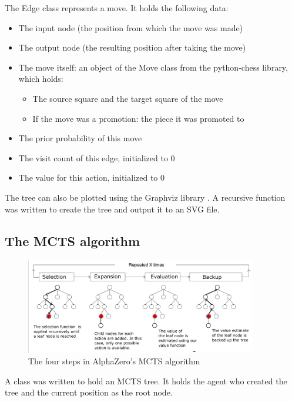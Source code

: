 \documentclass{article}
\begin{document}
The Edge class represents a move. It holds the following data:

\begin{itemize}
    \item The input node (the position from which the move was made)
    \item The output node (the resulting position after taking the move)
    \item The move itself: an object of the Move class from the python-chess library, which holds:
    \begin{itemize}
        \item The source square and the target square of the move
        \item If the move was a promotion: the piece it was promoted to
    \end{itemize}
    \item The prior probability of this move
    \item The visit count of this edge, initialized to 0
    \item The value for this action, initialized to 0
\end{itemize}

The tree can also be plotted using the Graphviz library \cite{Graphviz}. A recursive function was written to 
create the tree and output it to an SVG file. 

\subsection{The MCTS algorithm}


\begin{figure}[H]
    \centering
    \includegraphics[width=0.9\textwidth]{img/mcts-alphazero.png}
    \caption{The four steps in AlphaZero's MCTS algorithm \cite{bodensteinAlphaZero2019}}
\end{figure}

A class was written to hold an MCTS tree. It holds the agent who created the tree and the
current position as the root node. 
\end{document}
